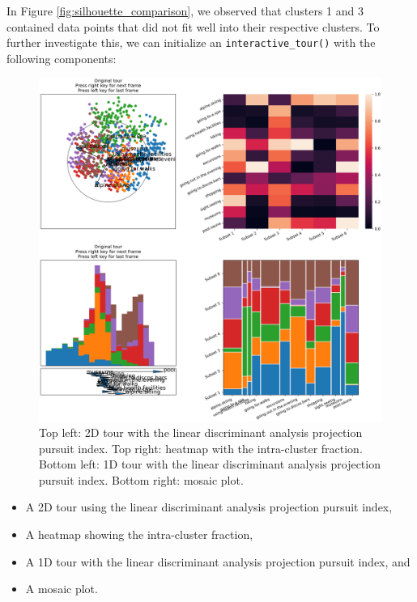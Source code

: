 \documentclass[article]{ajs}
\begin{document}
In Figure \ref{fig:silhouette_comparison}, we observed that clusters 1 and 3 contained data points that did not fit well into their respective clusters. To further investigate this, we can initialize an \texttt{interactive\_tour()} with the following components:

\begin{figure}[h!]
    \centering
    \includegraphics[width=1\textwidth]{winter_cl7_init.png}
    \caption{Top left: 2D tour with the linear discriminant analysis projection pursuit index. Top right: heatmap with the intra-cluster fraction. Bottom left: 1D tour with the linear discriminant analysis projection pursuit index. Bottom right: mosaic plot.}
    \label{fig:winter_cl7_init}
\end{figure}

\begin{itemize}
    \item A 2D tour using the linear discriminant analysis projection pursuit index,
    \item A heatmap showing the intra-cluster fraction,
    \item A 1D tour with the linear discriminant analysis projection pursuit index, and
    \item A mosaic plot.
\end{itemize}
\end{document}
